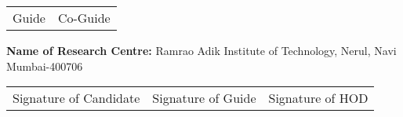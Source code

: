		
		\begin{center}
			\begin{tabular}{p{5cm} p{5cm}}
				\centering Guide & \centering  Co-Guide\\
			\end{tabular}
		\end{center}
		
		
		
		\begin{center}
			{\normalsize \textbf{Name of Research Centre:} Ramrao Adik Institute of Technology, Nerul, Navi Mumbai-400706}
		\end{center}
		
		\vspace{4em}
		
		\begin{center}
			\begin{tabular}{p{5cm} p{5cm} p{5cm}}
				\centering Signature of Candidate & \centering Signature of Guide & \centering Signature of HOD \\
			\end{tabular}
		\end{center}
		
		
		
%	
		
	\setlength{\parskip}{0.0em} %
			
